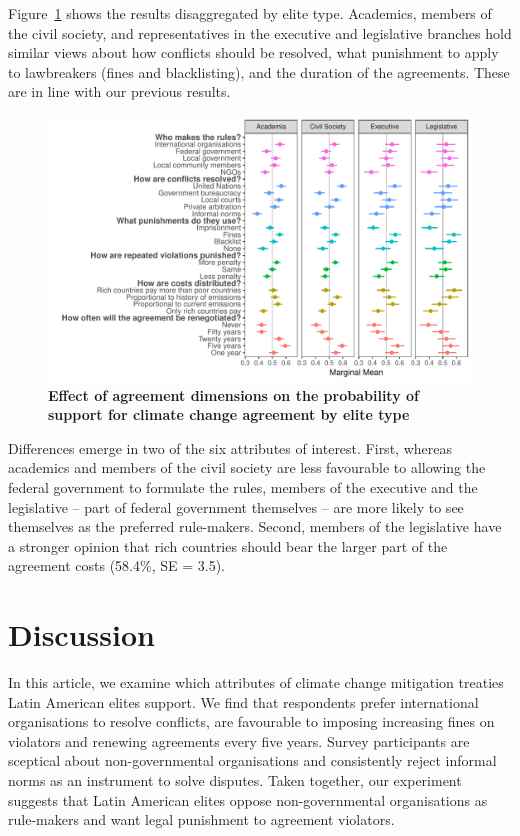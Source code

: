 \documentclass[a4paper,12pt]{article}
\begin{document}
Figure~\ref{fig:types} shows the results disaggregated by elite type. Academics, members of the civil society, and representatives in the executive and legislative branches hold similar views about how conflicts should be resolved, what punishment to apply to lawbreakers (fines and blacklisting), and the duration of the agreements. These are in line with our previous results.

\begin{figure}[H]
	\centering
	\includegraphics[width=\linewidth]{types.pdf}
	\caption{\textbf{Effect of agreement dimensions on the probability of support for climate change agreement by elite type}}
	\label{fig:types}
\end{figure}

Differences emerge in two of the six attributes of interest. First, whereas academics and members of the civil society are less favourable to allowing the federal government to formulate the rules, members of the executive and the legislative -- part of federal government themselves -- are more likely to see themselves as the preferred rule-makers. Second, members of the legislative have a stronger opinion that rich countries should bear the larger part of the agreement costs (58.4\%, SE = 3.5). 

\section{Discussion}
\label{sec:discussion}

In this article, we examine which attributes of climate change mitigation treaties Latin American elites support. We find that respondents prefer international organisations to resolve conflicts, are favourable to imposing increasing fines on violators and renewing agreements every five years. Survey participants are sceptical about non-governmental organisations and consistently reject informal norms as an instrument to solve disputes. Taken together, our experiment suggests that Latin American elites oppose non-governmental organisations as rule-makers and want legal punishment to agreement violators. 
\end{document}
